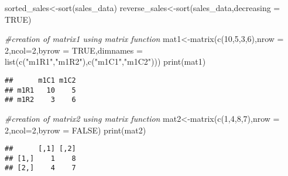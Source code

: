 \documentclass[
]{article}
\newenvironment{Shaded}{\begin{snugshade}}{\end{snugshade}}
\newcommand{\AttributeTok}[1]{\textcolor[rgb]{0.77,0.63,0.00}{#1}}
\newcommand{\CommentTok}[1]{\textcolor[rgb]{0.56,0.35,0.01}{\textit{#1}}}
\newcommand{\ConstantTok}[1]{\textcolor[rgb]{0.00,0.00,0.00}{#1}}
\newcommand{\DecValTok}[1]{\textcolor[rgb]{0.00,0.00,0.81}{#1}}
\newcommand{\FunctionTok}[1]{\textcolor[rgb]{0.00,0.00,0.00}{#1}}
\newcommand{\NormalTok}[1]{#1}
\newcommand{\OtherTok}[1]{\textcolor[rgb]{0.56,0.35,0.01}{#1}}
\newcommand{\StringTok}[1]{\textcolor[rgb]{0.31,0.60,0.02}{#1}}
\begin{document}
\begin{Shaded}
\begin{Highlighting}[]
\NormalTok{sorted\_sales}\OtherTok{\textless{}{-}}\FunctionTok{sort}\NormalTok{(sales\_data)}
\NormalTok{reverse\_sales}\OtherTok{\textless{}{-}}\FunctionTok{sort}\NormalTok{(sales\_data,}\AttributeTok{decreasing =} \ConstantTok{TRUE}\NormalTok{)}
\end{Highlighting}
\end{Shaded}

\begin{Shaded}
\begin{Highlighting}[]
\CommentTok{\#creation of matrix1 using matrix function}
\NormalTok{mat1}\OtherTok{\textless{}{-}}\FunctionTok{matrix}\NormalTok{(}\FunctionTok{c}\NormalTok{(}\DecValTok{10}\NormalTok{,}\DecValTok{5}\NormalTok{,}\DecValTok{3}\NormalTok{,}\DecValTok{6}\NormalTok{),}\AttributeTok{nrow =} \DecValTok{2}\NormalTok{,}\AttributeTok{ncol=}\DecValTok{2}\NormalTok{,}\AttributeTok{byrow =} \ConstantTok{TRUE}\NormalTok{,}\AttributeTok{dimnames =} \FunctionTok{list}\NormalTok{(}\FunctionTok{c}\NormalTok{(}\StringTok{"m1R1"}\NormalTok{,}\StringTok{"m1R2"}\NormalTok{),}\FunctionTok{c}\NormalTok{(}\StringTok{"m1C1"}\NormalTok{,}\StringTok{"m1C2"}\NormalTok{)))}
\FunctionTok{print}\NormalTok{(mat1)}
\end{Highlighting}
\end{Shaded}

\begin{verbatim}
##      m1C1 m1C2
## m1R1   10    5
## m1R2    3    6
\end{verbatim}

\begin{Shaded}
\begin{Highlighting}[]
\CommentTok{\#creation of matrix2 using matrix function}
\NormalTok{mat2}\OtherTok{\textless{}{-}}\FunctionTok{matrix}\NormalTok{(}\FunctionTok{c}\NormalTok{(}\DecValTok{1}\NormalTok{,}\DecValTok{4}\NormalTok{,}\DecValTok{8}\NormalTok{,}\DecValTok{7}\NormalTok{),}\AttributeTok{nrow =} \DecValTok{2}\NormalTok{,}\AttributeTok{ncol=}\DecValTok{2}\NormalTok{,}\AttributeTok{byrow =} \ConstantTok{FALSE}\NormalTok{)}
\FunctionTok{print}\NormalTok{(mat2)}
\end{Highlighting}
\end{Shaded}

\begin{verbatim}
##      [,1] [,2]
## [1,]    1    8
## [2,]    4    7
\end{verbatim}
\end{document}
